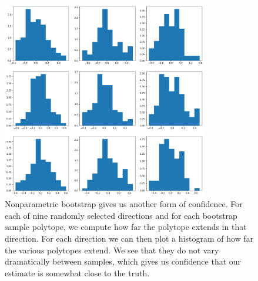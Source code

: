 \begin{figure}
\includegraphics[width=0.8\textwidth]{pics/allenbootstrapnonparametric}
\caption{Nonparametric bootstrap gives us another form of confidence.  For each of nine randomly selected directions and for each bootstrap sample polytope, we compute how far the polytope extends in that direction.   For each direction we can then plot a histogram of how far the various polytopes extend.  We see that they do not vary dramatically between samples, which gives us confidence that our estimate is somewhat close to the truth.\label{fig:allenbootstrap}}
\end{figure}

